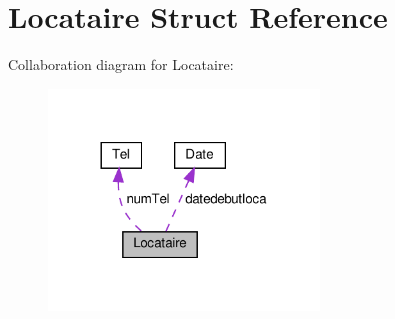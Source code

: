 \hypertarget{struct_locataire}{}\section{Locataire Struct Reference}
\label{struct_locataire}


Collaboration diagram for Locataire\+:
\nopagebreak
\begin{figure}[H]
\begin{center}
\leavevmode
\includegraphics[width=204pt]{struct_locataire__coll__graph}
\end{center}
\end{figure}
